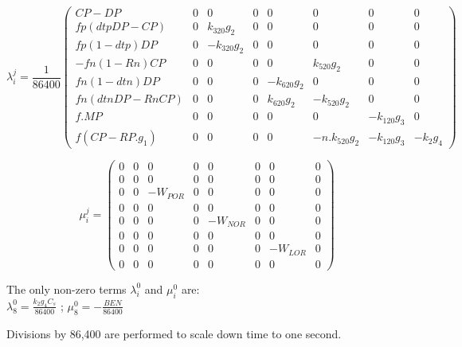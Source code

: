 $$  \lambda_i^j = \frac{1}{86400}
  \begin{pmatrix}
    CP-DP               & 0 &            0 & 0 & 0 & 0 & 0 & 0 \\
    fp (dtp DP -CP)     & 0 &  k_{320} g_2  & 0 & 0 & 0 & 0 & 0 \\
    fp (1-dtp) DP       & 0 & -k_{320} g_2  & 0 & 0 & 0 & 0 & 0 \\
   -fn (1 -Rn) CP       & 0 &        0 & 0 & 0 &  k_{520} g_2 & 0 & 0 \\
    fn (1-dtn) DP       & 0 &        0 & 0 & -k_{620} g_2 & 0 & 0 & 0 \\
    fn (dtn DP - Rn CP) & 0 &        0 & 0 &  k_{620} g_2 & -k_{520} g_2 & 0 & 0 \\
    f . MP              & 0 &        0 & 0 & 0 & 0 & -k_{120} g_3 & 0 \\
    f (CP - RP .  g_1 ) & 0 &        0 & 0 & 0 & -n.k_{520} g_2 & -k_{120} g_3 & - k_2 g_4
  \end{pmatrix}
$$  

$$
  \mu_i^j = 
  \begin{pmatrix}
   0 & 0 & 0 & 0 & 0 & 0 & 0 & 0 \\
   0 & 0 & 0 & 0 & 0 & 0 & 0 & 0 \\
   0 & 0 & -W_{POR} & 0 & 0 & 0 & 0 & 0 \\
   0 & 0 & 0 & 0 & 0 & 0 & 0 & 0 \\
   0 & 0 & 0 & 0 & -W_{NOR} & 0 & 0 & 0 \\
   0 & 0 & 0 & 0 & 0 & 0 & 0 & 0 \\
   0 & 0 & 0 & 0 & 0 & 0 & -W_{LOR} & 0 \\
   0 & 0 & 0 & 0 & 0 & 0 & 0 & 0 
  \end{pmatrix}
$$

The only non-zero terms $\lambda_i^0$ and $\mu_i^0$ are:\\

$\lambda_8^0 = \frac{k_2 g_4 C_s}{86400}$ ; $\mu_8^0 = -\frac{BEN}{86400}$

Divisions by 86,400 are performed to scale down time to one second.
